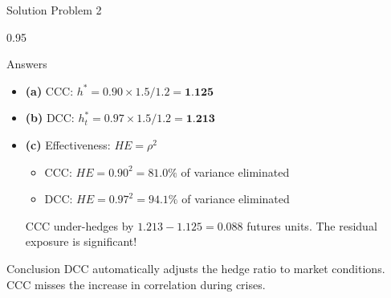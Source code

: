 \documentclass[9pt, aspectratio=169, t]{beamer}
\begin{document}
\begin{frame}{Solution Problem 2}
    \begin{cminipage}{0.95\textwidth}
    \begin{exampleblock}{Answers}
        \begin{itemize}\setlength{\itemsep}{0pt}
            \item \textbf{(a)} CCC: $h^* = 0.90 \times 1.5/1.2 = \textbf{1.125}$

            \vspace{0.2cm}

            \item \textbf{(b)} DCC: $h_t^* = 0.97 \times 1.5/1.2 = \textbf{1.213}$

            \vspace{0.2cm}

            \item \textbf{(c)} Effectiveness: $HE = \rho^2$
            \begin{itemize}\setlength{\itemsep}{0pt}
                \item CCC: $HE = 0.90^2 = 81.0\%$ of variance eliminated
                \item DCC: $HE = 0.97^2 = 94.1\%$ of variance eliminated
            \end{itemize}

            \vspace{0.2cm}

            CCC under-hedges by $1.213 - 1.125 = 0.088$ futures units. The residual exposure is significant!
        \end{itemize}
    \end{exampleblock}

    \begin{alertblock}{Conclusion}
        DCC automatically adjusts the hedge ratio to market conditions. CCC misses the increase in correlation during crises.
    \end{alertblock}
    \end{cminipage}
\end{frame}
\end{document}
